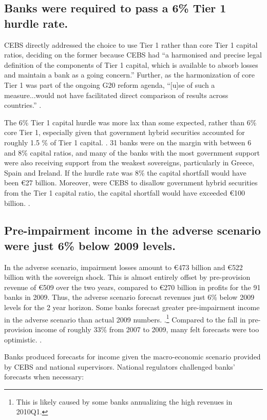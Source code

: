 \documentclass[12pt]{article}
\begin{document}
\subsection{Banks were required to pass a 6\% Tier 1 hurdle rate.}

CEBS directly addressed the choice to use Tier 1 rather than core Tier 1 capital ratios, deciding on the former because CEBS had ``a harmonised and precise legal definition of the components of Tier 1 capital, which is available to absorb losses and maintain a bank as a going concern.'' Further, as the harmonization of core Tier 1 was part of the ongoing G20 reform agenda, ``[u]se of such a measure...would not have facilitated direct comparison of results across countries.'' \citep{QA}.

The 6\% Tier 1 capital hurdle was more lax than some expected, rather than 6\% core Tier 1, especially given that government hybrid securities accounted for roughly 1.5 \% of Tier 1 capital. \citep{Gonzalez}. 31 banks were on the margin with between 6 and 8\% capital ratios, and many of the banks with the most government support were also receiving support from the weakest sovereigns, particularly in Greece, Spain and Ireland. If the hurdle rate was 8\% the capital shortfall would have been \euro{27} billion. Moreover, were CEBS to disallow government hybrid securities from the Tier 1 capital ratio, the capital shortfall would have exceeded \euro{100} billion. \citep{Deutsche}.

\subsection{Pre-impairment income in the adverse scenario were just 6\% below 2009 levels.}

In the adverse scenario, impairment losses amount to \euro{473} billion and \euro{522} billion with the sovereign shock. This is almost entirely offset by pre-provision revenue of \euro{509} over the two years, compared to \euro{270} billion in profits for the 91 banks in 2009. Thus, the adverse scenario forecast revenues just 6\% below 2009 levels for the 2 year horizon. Some banks forecast greater pre-impairment income in the adverse scenario than actual 2009 numbers. \citep{Deutsche}.\footnote{This is likely caused by some banks annualizing the high revenues in 2010Q1.} Compared to the fall in pre-provision income of roughly 33\% from 2007 to 2009, many felt forecasts were too optimistic. \citep{Samuels}.

Banks produced forecasts for income given the macro-economic scenario provided by CEBS and national supervisors. National regulators challenged banks' forecasts when necessary:
\end{document}
